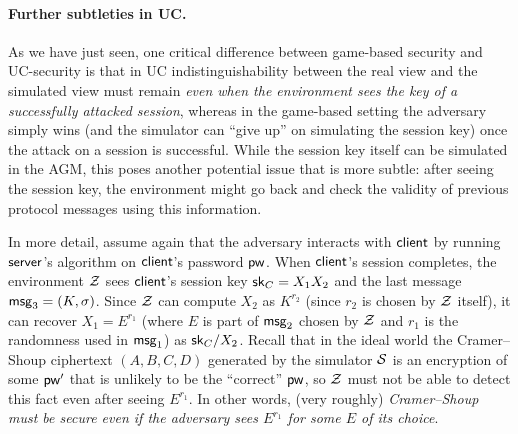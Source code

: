 \paragraph{Further subtleties in UC.}
As we have just seen, one critical difference between game-based security and UC-security is that in UC indistinguishability between the real view and the simulated view must remain \emph{even when the environment sees the key of a successfully attacked session}, whereas in the game-based setting the adversary simply wins (and the simulator can ``give up'' on simulating the session key) once the attack on a session is successful. While the session key itself can be simulated in the AGM, this poses another potential issue that is more subtle: after seeing the session key, the environment might go back and check the validity of previous protocol messages using this information.

In more detail, assume again that the adversary interacts with $\mathsf{client}$ by running $\mathsf{server}$'s algorithm on $\mathsf{client}$'s password $\mathsf{pw}$. When $\mathsf{client}$'s session completes, the environment $\mathcal{Z}$ sees $\mathsf{client}$'s session key $\mathsf{sk}_C = X_1X_2$ and the last message $\mathsf{msg}_{3} = (K,\sigma)$. Since $\mathcal{Z}$ can compute $X_2$ as $K^{r_2}$ (since $r_2$ is chosen by $\mathcal{Z}$ itself), it can recover $X_1 = E^{r_1}$ (where $E$ is part of $\mathsf{msg}_{2}$ chosen by $\mathcal{Z}$ and $r_1$ is the randomness used in $\mathsf{msg}_{1}$) as $\mathsf{sk}_C/X_2$. Recall that in the ideal world the Cramer--Shoup ciphertext $(A,B,C,D)$ generated by the simulator $\mathcal{S}$ is an encryption of some $\mathsf{pw}'$ that is unlikely to be the ``correct'' $\mathsf{pw}$, so $\mathcal{Z}$ must not be able to detect this fact even after seeing $E^{r_1}$. In other words, (very roughly) \emph{Cramer--Shoup must be secure even if the adversary sees $E^{r_1}$ for some $E$ of its choice}.

